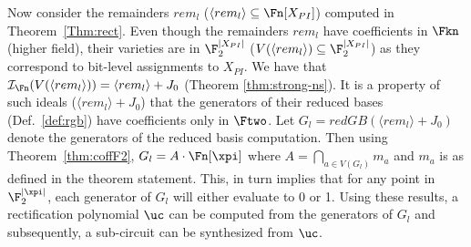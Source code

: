Now consider the remainders $rem_l$ ($\langle rem_l \rangle \subseteq \Fn[X_{PI}] $) computed in Theorem~\ref{Thm:rect}. 
Even though the remainders $rem_l$ have coefficients in $\Fkn$ (higher field), their varieties 
are in $\F_{2}^{|X_{PI}|}$ ($V(\langle rem_l\rangle)\subseteq \F_2^{|X_{PI}|}$) as they correspond to 
bit-level assignments to $X_{PI}$.
We have that $\mathcal{I}_{\Fn}(V(\langle rem_l\rangle)) = \langle rem_l \rangle + J_0$ (Theorem \ref{thm:strong-ns}).
It is a property of such ideals ($\langle rem_l \rangle + J_0 $) that the generators of their reduced
\Grobner bases (Def.~\ref{def:rgb}) have coefficients only in $\Ftwo$. Let $G_l=redGB(\langle rem_l \rangle + J_0 )$
denote the generators of the reduced \Grobner basis computation.
Then using Theorem~\ref{thm:coffF2}, $G_l = A \cdot \Fn[\xpi]$ where $A = \bigcap_{a\in V(G_l)}m_a$
and $m_a$ is as defined in the theorem statement. 
This, in turn implies that for 
any point in $\F_2^{|\xpi|}$, each generator of $G_l$ will either evaluate to 0 or 1.
Using these results, a rectification polynomial $\uc$ can be computed
from the generators of $G_l$ and subsequently, a sub-circuit can be synthesized from $\uc$. 



